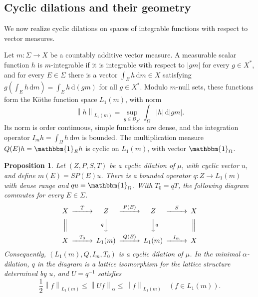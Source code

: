 \documentclass[11pt,leqno]{amsart}
\theoremstyle{compact}
\numberwithin{equation}{section}
\newtheorem{proposition}[theorem]{Proposition}
\theoremstyle{compactremark}
\theoremstyle{compact}
\newcommand{\1}{\mathbbm{1}}
\newcommand{\rmd}{\mathrm{d}}
\newcommand{\norm}[1]{\left\|#1\right\|}
\newcommand{\abs}[1]{\left|#1\right|}
\begin{document}
\subsection[Cyclic dilations and their geometry]{Cyclic dilations and their geometry}

We now realize cyclic dilations on spaces of integrable functions with respect to vector measures.

Let $m\colon\Sigma\to X$ be a countably additive vector measure. A measurable scalar function $h$ is $m$-integrable if it is integrable with respect to $\abs{gm}$ for every $g\in X^*$, and for every $E\in\Sigma$ there is a vector $\int_Eh\,\rmd m\in X$ satisfying $g(\int_Eh\,\rmd m)=\int_Eh\,\rmd(gm)$ for all $g\in X^*$. Modulo $m$-null sets, these functions form the K\"othe function space $L_1(m)$, with norm
\[
\norm{h}_{L_1(m)}=\sup_{g\in B_{X^*}}\int_\Omega\abs{h}\,\rmd\abs{gm}.
\]
Its norm is order continuous, simple functions are dense, and the integration operator $I_mh=\int_\Omega h\,\rmd m$ is bounded. The multiplication measure $Q(E)h=\1_Eh$ is cyclic on $L_1(m)$, with vector $\1_\Omega$.

\begingroup
\begin{proposition}\label{prop:vector-measure-dilation}
Let $(Z,P,S,T)$ be a cyclic dilation of $\mu$, with cyclic vector $u$, and define $m(E)=SP(E)u$. There is a bounded operator $q\colon Z\to L_1(m)$ with dense range and $qu=\1_\Omega$. With $T_0=qT$, the following diagram commutes for every $E\in\Sigma$.
\[
\begin{CD}
    X @>{T}>> Z @>{P(E)}>> Z @>{S}>> X\\
    @| @V{q}VV @VV{q}V @|\\
    X @>{T_0}>> L_1(m) @>{Q(E)}>> L_1(m) @>{I_m}>> X
\end{CD}
\]
Consequently, $(L_1(m),Q,I_m,T_0)$ is a cyclic dilation of $\mu$. In the minimal $\alpha$-dilation, $q$ in the diagram is a lattice isomorphism for the lattice structure determined by $u$, and $U=q^{-1}$ satisfies
\[
\frac{1}{2}\norm{f}_{L_1(m)}\leq\norm{Uf}_\alpha\leq\norm{f}_{L_1(m)}\quad(f\in L_1(m)).
\]
\end{proposition}
\end{document}
